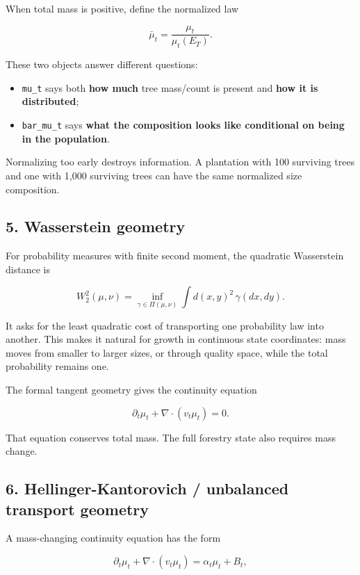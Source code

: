 When total mass is positive, define the normalized law

\[
\bar\mu_t=\frac{\mu_t}{\mu_t(E_T)}.
\]

These two objects answer different questions:

\begin{itemize}
\tightlist
\item
  \texttt{mu\_t} says both \textbf{how much} tree mass/count is present and \textbf{how it is
  distributed};
\item
  \texttt{bar\_mu\_t} says \textbf{what the composition looks like conditional on being in the
  population}.
\end{itemize}

Normalizing too early destroys information. A plantation with 100 surviving
trees and one with 1,000 surviving trees can have the same normalized size
composition.

\subsection{5. Wasserstein geometry}\label{wasserstein-geometry}

For probability measures with finite second moment, the quadratic Wasserstein
distance is

\[
W_2^2(\mu,\nu)=\inf_{\gamma\in\Pi(\mu,\nu)}
\int d(x,y)^2\,\gamma(dx,dy).
\]

It asks for the least quadratic cost of transporting one probability law into
another. This makes it natural for growth in continuous state coordinates: mass
moves from smaller to larger sizes, or through quality space, while the total
probability remains one.

The formal tangent geometry gives the continuity equation

\[
\partial_t\mu_t+\nabla\cdot(v_t\mu_t)=0.
\]

That equation conserves total mass. The full forestry state also requires mass
change.

\subsection{6. Hellinger-Kantorovich / unbalanced transport geometry}\label{hellinger-kantorovich-unbalanced-transport-geometry}

A mass-changing continuity equation has the form

\[
\partial_t\mu_t+\nabla\cdot(v_t\mu_t)
=\alpha_t\mu_t+B_t,
\]


